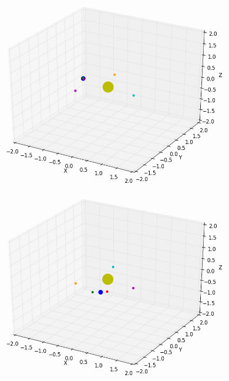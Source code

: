 \documentclass[10pt,letterpaper]{article}
\begin{document}
\begin{figure}[!htb]
  \includegraphics[width=\linewidth]{figures/lagrange_points/lagrange_points_stability_1.png}
  \subcaption{}\label{fig:lagrange_points_stability_fig1}
\endminipage\hfill
{}
  \includegraphics[width=\linewidth]{figures/lagrange_points/lagrange_points_stability_2.png}
  \subcaption{}\label{fig:lagrange_points_stability_fig2}
\endminipage\hfill
{}%

\end{figure}
\end{document}
